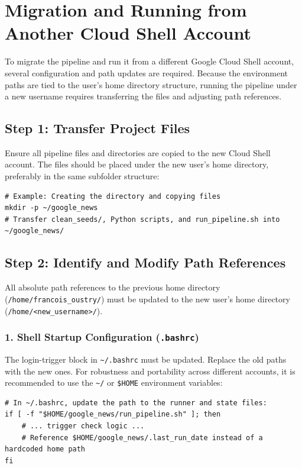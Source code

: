 \documentclass[11pt,a4paper]{article}
\begin{document}
\section{Migration and Running from Another Cloud Shell Account}
\label{sec:migration}

To migrate the pipeline and run it from a different Google Cloud Shell account, several configuration and path updates are required. Because the environment paths are tied to the user's home directory structure, running the pipeline under a new username requires transferring the files and adjusting path references.

\subsection{Step 1: Transfer Project Files}
Ensure all pipeline files and directories are copied to the new Cloud Shell account. The files should be placed under the new user's home directory, preferably in the same subfolder structure:
\begin{lstlisting}[style=bash]
# Example: Creating the directory and copying files
mkdir -p ~/google_news
# Transfer clean_seeds/, Python scripts, and run_pipeline.sh into ~/google_news/
\end{lstlisting}

\subsection{Step 2: Identify and Modify Path References}
All absolute path references to the previous home directory (\texttt{/home/francois\_oustry/}) must be updated to the new user's home directory (\texttt{/home/<new\_username>/}).

\subsubsection{1. Shell Startup Configuration (\texttt{.bashrc})}
The login-trigger block in \verb|~/.bashrc| must be updated. Replace the old paths with the new ones. For robustness and portability across different accounts, it is recommended to use the \verb|~/| or \verb|$HOME| environment variables:
\begin{lstlisting}[style=bash]
# In ~/.bashrc, update the path to the runner and state files:
if [ -f "$HOME/google_news/run_pipeline.sh" ]; then
    # ... trigger check logic ...
    # Reference $HOME/google_news/.last_run_date instead of a hardcoded home path
fi
\end{lstlisting}
\end{document}
